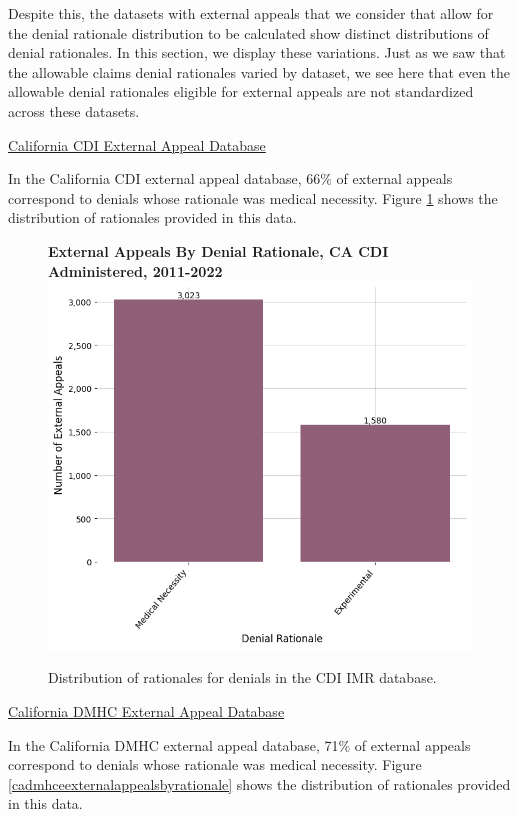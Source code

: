 \documentclass[12pt, a4paper,twoside]{report}
\theoremstyle{plain} %
\theoremstyle{definition} %
\theoremstyle{remark} %
\numberwithin{equation}{chapter}
\begin{document}
		Despite this, the datasets with external appeals that we consider that allow for the denial rationale distribution to be calculated show distinct distributions of denial rationales. In this section, we display these variations. Just as we saw that the allowable claims denial rationales varied by dataset, we see here that even the allowable denial rationales eligible for external appeals are not standardized across these datasets.
		
		
		\underline{California CDI External Appeal Database}
		
		In the California CDI external appeal database, 66\% of external appeals correspond to denials whose rationale was medical necessity. Figure \ref{cacdieexternalappealsbyrationale} shows the distribution of rationales provided in this data.
		
		\begin{figure}[h!]
			\centering
			\textbf{External Appeals By Denial Rationale, CA CDI Administered, 2011-2022}
			\includegraphics[width=.8\textwidth]{images/ca_doi_external_appeals/external_appeals_by_denial_reason.png}
			\caption{Distribution of rationales for denials in the CDI IMR database.}
			\label{cacdieexternalappealsbyrationale}
		\end{figure}
	
		\underline{California DMHC External Appeal Database}
	
		In the California DMHC external appeal database, 71\% of external appeals correspond to denials whose rationale was medical necessity. Figure \ref{cadmhceexternalappealsbyrationale} shows the distribution of rationales provided in this data.
		
\end{document}
